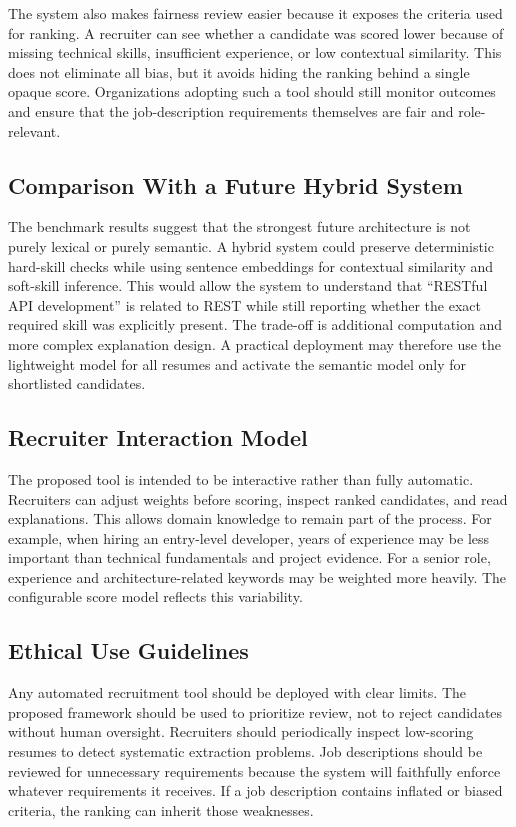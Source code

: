 \documentclass[conference]{IEEEtran}
\begin{document}
The system also makes fairness review easier because it exposes the criteria used for ranking. A recruiter can see whether a candidate was scored lower because of missing technical skills, insufficient experience, or low contextual similarity. This does not eliminate all bias, but it avoids hiding the ranking behind a single opaque score. Organizations adopting such a tool should still monitor outcomes and ensure that the job-description requirements themselves are fair and role-relevant.

\subsection{Comparison With a Future Hybrid System}
The benchmark results suggest that the strongest future architecture is not purely lexical or purely semantic. A hybrid system could preserve deterministic hard-skill checks while using sentence embeddings for contextual similarity and soft-skill inference. This would allow the system to understand that ``RESTful API development'' is related to REST while still reporting whether the exact required skill was explicitly present. The trade-off is additional computation and more complex explanation design. A practical deployment may therefore use the lightweight model for all resumes and activate the semantic model only for shortlisted candidates.

\subsection{Recruiter Interaction Model}
The proposed tool is intended to be interactive rather than fully automatic. Recruiters can adjust weights before scoring, inspect ranked candidates, and read explanations. This allows domain knowledge to remain part of the process. For example, when hiring an entry-level developer, years of experience may be less important than technical fundamentals and project evidence. For a senior role, experience and architecture-related keywords may be weighted more heavily. The configurable score model reflects this variability.

\subsection{Ethical Use Guidelines}
Any automated recruitment tool should be deployed with clear limits. The proposed framework should be used to prioritize review, not to reject candidates without human oversight. Recruiters should periodically inspect low-scoring resumes to detect systematic extraction problems. Job descriptions should be reviewed for unnecessary requirements because the system will faithfully enforce whatever requirements it receives. If a job description contains inflated or biased criteria, the ranking can inherit those weaknesses.
\end{document}
